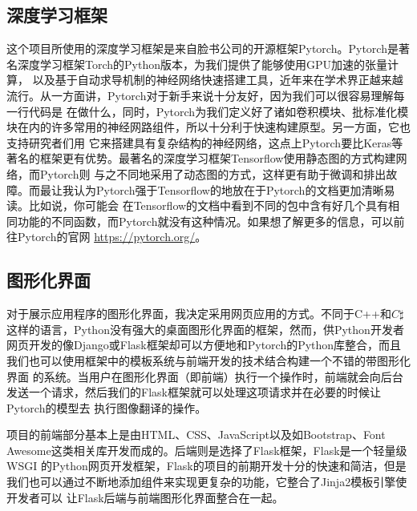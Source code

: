 \documentclass[supercite]{HustGraduPaper}
\theoremstyle{definition}
\begin{document}
\subsection{深度学习框架}

这个项目所使用的深度学习框架是来自脸书公司的开源框架Pytorch。Pytorch是著名深度学习框架Torch的Python版本，为我们提供了能够使用GPU加速的张量计算，
以及基于自动求导机制的神经网络快速搭建工具，近年来在学术界正越来越流行。从一方面讲，Pytorch对于新手来说十分友好，因为我们可以很容易理解每一行代码是
在做什么，同时，Pytorch为我们定义好了诸如卷积模块、批标准化模块在内的许多常用的神经网路组件，所以十分利于快速构建原型。另一方面，它也支持研究者们用
它来搭建具有复杂结构的神经网络，这点上Pytorch要比Keras等著名的框架更有优势。最著名的深度学习框架Tensorflow使用静态图的方式构建网络，而Pytorch则
与之不同地采用了动态图的方式，这样更有助于微调和排出故障。而最让我认为Pytorch强于Tensorflow的地放在于Pytorch的文档更加清晰易读。比如说，你可能会
在Tensorflow的文档中看到不同的包中含有好几个具有相同功能的不同函数，而Pytorch就没有这种情况。如果想了解更多的信息，可以前往Pytorch的官网
\href{https://pytorch.org/}{https://pytorch.org/}。

\subsection{图形化界面}

对于展示应用程序的图形化界面，我决定采用网页应用的方式。不同于C++和$C\sharp$这样的语言，Python没有强大的桌面图形化界面的框架，然而，供Python开发者
网页开发的像Django或Flask框架却可以方便地和Pytorch的Python库整合，而且我们也可以使用框架中的模板系统与前端开发的技术结合构建一个不错的带图形化界面
的系统。当用户在图形化界面（即前端）执行一个操作时，前端就会向后台发送一个请求，然后我们的Flask框架就可以处理这项请求并在必要的时候让Pytorch的模型去
执行图像翻译的操作。

项目的前端部分基本上是由HTML、CSS、JavaScript以及如Bootstrap、Font Awesome这类相关库开发而成的。后端则是选择了Flask框架，Flask是一个轻量级WSGI
的Python网页开发框架，Flask的项目的前期开发十分的快速和简洁，但是我们也可以通过不断地添加组件来实现更复杂的功能，它整合了Jinja2模板引擎使开发者可以
让Flask后端与前端图形化界面整合在一起。
\end{document}
